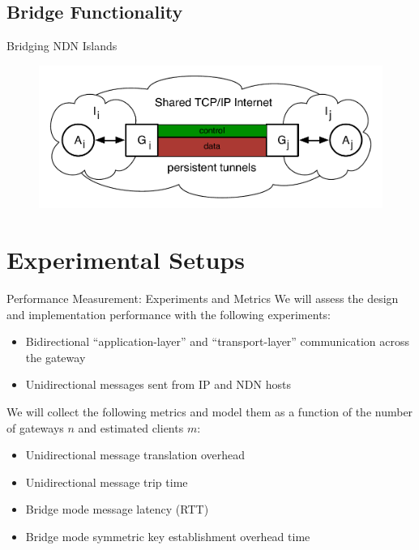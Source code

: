 \documentclass[handout]{beamer}
\begin{document}
\subsection{Bridge Functionality}
\begin{frame}{Bridging NDN Islands}
	\begin{figure}[h]
		\includegraphics[scale=0.5]{img/island_tunnel.pdf}
	\end{figure}
\end{frame}


\section{Experimental Setups}
\begin{frame}{Performance Measurement: Experiments and Metrics}
	We will assess the design and implementation performance with the following experiments:
	\begin{itemize}
		\item Bidirectional ``application-layer'' and ``transport-layer'' communication across the gateway
		\item Unidirectional messages sent from IP and NDN hosts
	\end{itemize}
	We will collect the following metrics and model them as a function of the number of gateways $n$ and estimated clients $m$:
	\begin{itemize}
		\item Unidirectional message translation overhead
		\item Unidirectional message trip time
		\item Bridge mode message latency (RTT)
		\item Bridge mode symmetric key establishment overhead time
	\end{itemize}
\end{frame}
\end{document}
